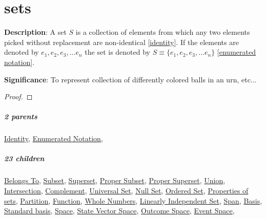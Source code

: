 \documentclass[../main.tex]{subfiles}
\begin{document}
\chapter{sets}


\begin{statement}
\label{statement:Set}\hspace*{0pt}\par
\end{statement}
\textbf{Description}:
A set $S$ is a collection of elements from which any two elements picked without replacement are non-identical [\hyperref[statement:Identity]{identity}]. If the elements are denoted by $ e_1, e_2, e_3, ... e_n $ the set is denoted by $ S \equiv \{ e_1, e_2, e_3, ... e_n \} $ [\hyperref[statement:Enumerated Notation]{enumerated notation}].
\par
{\color{magenta} \textbf{Significance}:
To represent collection of differently colored balls in an urn, etc...
\par}
\begin{proof}
\proofbydefinition
\end{proof}\par
\paragraph{2 parents} \hyperref[statement:Identity]{Identity}, \hyperref[statement:Enumerated Notation]{Enumerated Notation}, 
\paragraph{23 children} \hyperref[statement:Belongs To]{Belongs To}, \hyperref[statement:Subset]{Subset}, \hyperref[statement:Superset]{Superset}, \hyperref[statement:Proper Subset]{Proper Subset}, \hyperref[statement:Proper Superset]{Proper Superset}, \hyperref[statement:Union]{Union}, \hyperref[statement:Intersection]{Intersection}, \hyperref[statement:Complement]{Complement}, \hyperref[statement:Universal Set]{Universal Set}, \hyperref[statement:Null Set]{Null Set}, \hyperref[statement:Ordered Set]{Ordered Set}, \hyperref[statement:Properties of sets]{Properties of sets}, \hyperref[statement:Partition]{Partition}, \hyperref[statement:Function]{Function}, \hyperref[statement:Whole Numbers]{Whole Numbers}, \hyperref[statement:Linearly Independent Set]{Linearly Independent Set}, \hyperref[statement:Span]{Span}, \hyperref[statement:Basis]{Basis}, \hyperref[statement:Standard basis]{Standard basis}, \hyperref[statement:Space]{Space}, \hyperref[statement:State Vector Space]{State Vector Space}, \hyperref[statement:Outcome Space]{Outcome Space}, \hyperref[statement:Event Space]{Event Space}, 
\end{document}
